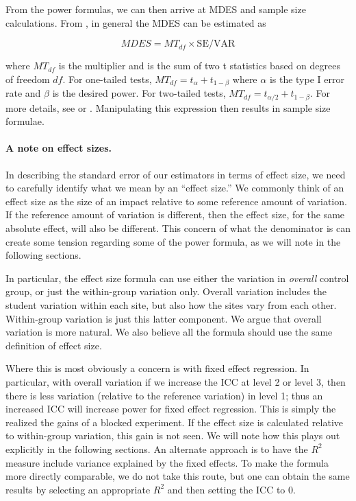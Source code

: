 \documentclass[12pt]{article}
\begin{document}
From the power formulas, we can then arrive at MDES and sample size calculations.
From \citet{Dong2013}, in general the MDES can be estimated as

$$ MDES = MT_{df} \times \text{SE} / \text{VAR} $$

where $MT_{df}$ is the multiplier and is the sum of two t statistics based on degrees of freedom $df$.
For one-tailed tests, $MT_{df} = t_{\alpha} + t_{1-\beta}$ where $\alpha$ is the type I error rate and $\beta$ is the desired power.  For two-tailed tests, $MT_{df} = t_{\alpha/2} + t_{1-\beta}$.
For more details, see \citet[page 31]{Dong2013} or \citet[page 22]{Bloom2006}.
Manipulating this expression then results in sample size formulae.


\paragraph{A note on effect sizes.}
In describing the standard error of our estimators in terms of effect size, we need to carefully identify what we mean by an ``effect size.''
We commonly think of an effect size as the size of an impact relative to some reference amount of variation.
If the reference amount of variation is different, then the effect size, for the same absolute effect, will also be different.
This concern of what the denominator is can create some tension regarding some of the power formula, as we will note in the following sections.

In particular, the effect size formula can use either the variation in \emph{overall} control group, or just the within-group variation only.
Overall variation includes the student variation within each site, but also how the sites vary from each other.  Within-group variation is just this latter component.
We argue that overall variation is more natural.
We also believe all the formula should use the same definition of effect size.

Where this is most obviously a concern is with fixed effect regression.
In particular, with overall variation if we increase the ICC at level 2 or level 3, then there is less variation (relative to the reference variation) in level 1; thus an increased ICC will increase power for fixed effect regression.
This is simply the realized the gains of a blocked experiment.
If the effect size is calculated relative to within-group variation, this gain is not seen.
We will note how this plays out explicitly in the following sections.
An alternate approach is to have the $R^2$ measure include variance explained by the fixed effects.
To make the formula more directly comparable, we do not take this route, but one can obtain the same results by selecting an appropriate $R^2$ and then setting the ICC to 0.
\end{document}
